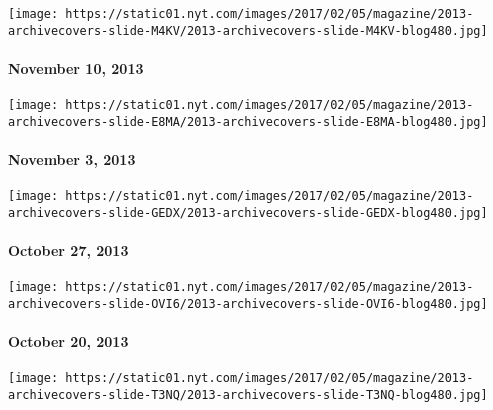 \href{http://www.nytimes.com/indexes/2013/11/10/magazine/index.html}{}

\texttt{[image: https://static01.nyt.com/images/2017/02/05/magazine/2013-archivecovers-slide-M4KV/2013-archivecovers-slide-M4KV-blog480.jpg]}

\hypertarget{november-10-2013}{%
\paragraph{November 10, 2013}\label{november-10-2013}}

\href{http://www.nytimes.com/indexes/2013/11/03/magazine/index.html}{}

\texttt{[image: https://static01.nyt.com/images/2017/02/05/magazine/2013-archivecovers-slide-E8MA/2013-archivecovers-slide-E8MA-blog480.jpg]}

\hypertarget{november-3-2013}{%
\paragraph{November 3, 2013}\label{november-3-2013}}

\href{http://www.nytimes.com/indexes/2013/10/27/magazine/index.html}{}

\texttt{[image: https://static01.nyt.com/images/2017/02/05/magazine/2013-archivecovers-slide-GEDX/2013-archivecovers-slide-GEDX-blog480.jpg]}

\hypertarget{october-27-2013}{%
\paragraph{October 27, 2013}\label{october-27-2013}}

\href{http://www.nytimes.com/indexes/2013/10/20/magazine/index.html}{}

\texttt{[image: https://static01.nyt.com/images/2017/02/05/magazine/2013-archivecovers-slide-OVI6/2013-archivecovers-slide-OVI6-blog480.jpg]}

\hypertarget{october-20-2013}{%
\paragraph{October 20, 2013}\label{october-20-2013}}

\href{http://www.nytimes.com/indexes/2013/10/13/magazine/index.html}{}

\texttt{[image: https://static01.nyt.com/images/2017/02/05/magazine/2013-archivecovers-slide-T3NQ/2013-archivecovers-slide-T3NQ-blog480.jpg]}

